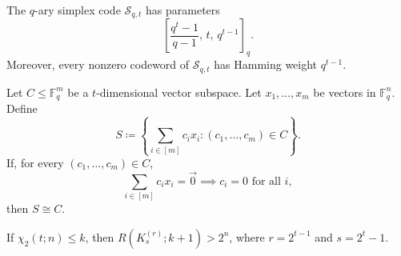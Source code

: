 \documentclass[10pt,a4paper]{amsart}
\begin{document}
\begin{Lemma} 
\label{lem:simplex}
    The $q$-ary simplex code $\mathcal{S}_{q,t}$ has parameters 
    \begin{equation*} \left[\frac{q^t-1}{q-1},\,t,\,q^{t-1}\right]_q. \end{equation*} 
    Moreover, every nonzero codeword of $\mathcal{S}_{q,t}$ has Hamming weight $q^{t-1}$. 
\end{Lemma}

\begin{Lemma}\label{lem:isomorphism}
    Let $C \leq \mathbb{F}_q^m$ be a $t$-dimensional vector subspace. 
    Let $x_1, \dots, x_m$ be vectors in $\mathbb{F}_q^n$. 
    Define
    \[
        S \coloneqq \left\{\sum_{i \in [m]} c_i x_i :
        (c_1, \dots, c_m) \in C\right\}.
    \]
    If, for every $(c_1,\dots,c_m)\in C$,
    \[
        \sum_{i \in [m]} c_i x_i = \vec{0}
        \implies c_i = 0 \text{ for all } i,
    \]
    then $S \cong C$.
\end{Lemma}

\begin{Theorem}
    If $\chi_2(t; n) \leq k$, then $R(K_s^{(r)}; k + 1) > 2^n$, where $r = 2^{t - 1}$ and $s = 2^t - 1$.
\end{Theorem}
\end{document}
